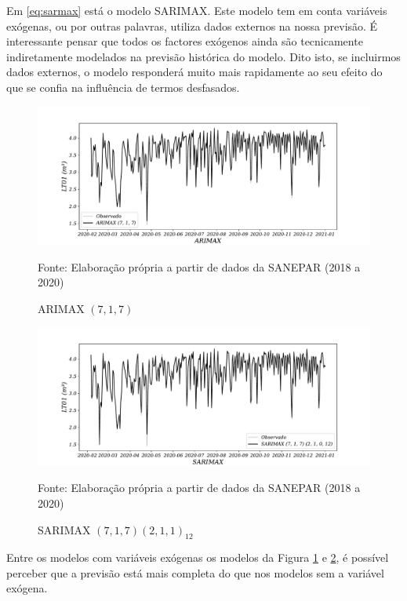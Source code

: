 Em \eqref{eq:sarmax} está o modelo SARIMAX. Este modelo tem em conta variáveis exógenas, ou por outras palavras, utiliza dados externos na nossa previsão. É interessante pensar que todos os factores exógenos ainda são tecnicamente indiretamente modelados na previsão histórica do modelo. Dito isto, se incluirmos dados externos, o modelo responderá muito mais rapidamente ao seu efeito do que se confia na influência de termos desfasados.

\begin{figure}[H]
	\centering
	\caption{ARIMAX $(7,1,7)$  }
	\label{fig:1-arimax}
	\includegraphics[width=1\linewidth]{Modelos/Figuras/0-ARIMAX}
	
	Fonte: Elaboração própria a partir de dados da SANEPAR (2018 a 2020)
\end{figure}

\begin{figure}[H]
	\centering
	\caption{SARIMAX $(7,1,7) (2,1,1)_{12}$  }
	\label{fig:1-sarimax}
	\includegraphics[width=1\linewidth]{Modelos/Figuras/0-SARIMAX}
	
	Fonte: Elaboração própria a partir de dados da SANEPAR (2018 a 2020)
\end{figure}


Entre os modelos com variáveis exógenas os modelos da Figura \ref{fig:1-arimax} e \ref{fig:1-sarimax}, é possível perceber que a previsão está mais completa do que nos modelos sem a variável exógena.

